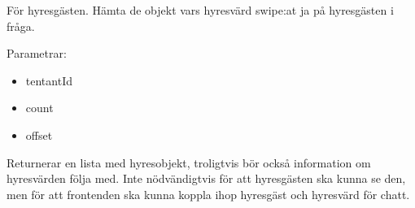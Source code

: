 \documentclass{article}
\begin{document}
För hyresgästen. Hämta de objekt vars hyresvärd swipe:at ja på hyresgästen i fråga.

Parametrar:

\begin{itemize}
    \item tentantId
    \item count
    \item offset
\end{itemize}

Returnerar en lista med hyresobjekt, troligtvis bör också information om hyresvärden följa med. Inte nödvändigtvis för att hyresgästen ska kunna se
den, men för att frontenden ska kunna koppla ihop hyresgäst och hyresvärd för chatt.
\end{document}
